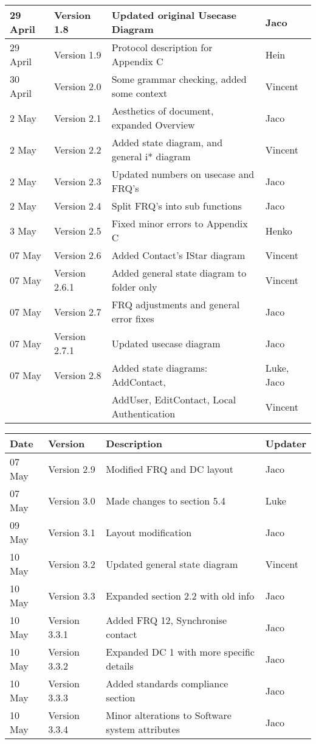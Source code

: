 \begin{center}
\begin{tabular}{|l|l|l|l|}
\hline
29 April & Version 1.8 & Updated original Usecase Diagram& Jaco\\
\hline
29 April & Version 1.9 & Protocol description for Appendix C& Hein\\
\hline
30 April & Version 2.0 & Some grammar checking, added some context & Vincent\\
\hline
2 May & Version 2.1 & Aesthetics of document, expanded Overview& Jaco\\
\hline
2 May & Version 2.2 & Added state diagram, and general i* diagram & Vincent\\
\hline
2 May & Version 2.3 & Updated numbers on usecase and FRQ's & Jaco\\
\hline
2 May & Version 2.4 & Split FRQ's into sub functions& Jaco\\
\hline
3 May & Version 2.5 & Fixed minor errors to Appendix C& Henko\\
\hline
07 May & Version 2.6 & Added Contact's IStar diagram & Vincent\\
\hline
07 May & Version 2.6.1 & Added general state diagram to folder only & Vincent\\
\hline
07 May & Version 2.7 & FRQ adjustments and general error fixes & Jaco\\
\hline
07 May & Version 2.7.1 & Updated usecase diagram& Jaco\\
\hline
07 May & Version 2.8 &Added state diagrams: AddContact, &Luke, Jaco\\
&&AddUser, EditContact, Local Authentication&Vincent\\
\hline
\end{tabular}

\begin{tabular}{|l|l|l|l|}

\hline
\textbf{Date} & \textbf{Version} & \textbf{Description}&\textbf{Updater}\\ 
\hline
07 May & Version 2.9 & Modified FRQ and DC layout & Jaco\\
\hline
07 May & Version 3.0 & Made changes to section 5.4 & Luke\\
\hline
09 May & Version 3.1 & Layout modification & Jaco\\
\hline
10 May & Version 3.2 & Updated general state diagram & Vincent\\
\hline
10 May & Version 3.3 & Expanded section 2.2 with old info& Jaco\\
\hline
10 May & Version 3.3.1 & Added FRQ 12, Synchronise contact& Jaco\\
\hline
10 May & Version 3.3.2 & Expanded DC 1 with more specific details& Jaco\\
\hline
10 May & Version 3.3.3 & Added standards compliance section& Jaco\\
\hline
10 May & Version 3.3.4 & Minor alterations to Software system attributes& Jaco\\
\hline
\end{tabular}


\end{center}
